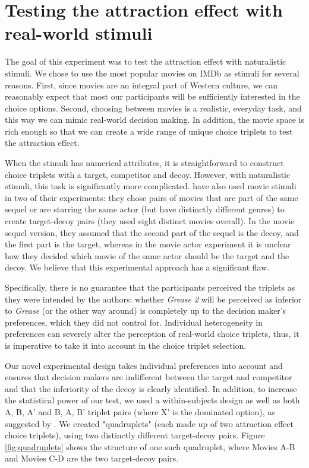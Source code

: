 \documentclass[12pt, a4paper]{article}
\begin{document}
\section{Testing the attraction effect with real-world stimuli}

The goal of this experiment was to test the attraction effect with naturalistic stimuli. We chose to use the most popular movies on IMDb as stimuli for several reasons. First, since movies are an integral part of Western culture, we can reasonably expect that most our participants will be sufficiently interested in the choice options. Second, choosing between movies is a realistic, everyday task, and this way we can mimic real-world decision making. In addition, the movie space is rich enough so that we can create a wide range of unique choice triplets to test the attraction effect.

When the stimuli has numerical attributes, it is straightforward to construct choice triplets with a target, competitor and decoy. However, with naturalistic stimuli, this task is significantly more complicated. \citeauthor{Frederick2014} have also used movie stimuli in two of their experiments: they chose pairs of movies that are part of the same sequel or are starring the same actor (but have distinctly different genres) to create target-decoy pairs (they used eight distinct movies overall). In the movie sequel version, they assumed that the second part of the sequel is the decoy, and the first part is the target, whereas in the movie actor experiment it is unclear how they decided which movie of the same actor should be the target and the decoy. We believe that this experimental approach has a significant flaw. 

Specifically, there is no guarantee that the participants perceived the triplets as they were intended by the authors: whether \textit{Grease 2} will be perceived as inferior to \textit{Grease} (or the other way around) is completely up to the decision maker's preferences, which they did not control for. Individual heterogeneity in preferences can severely alter the perception of real-world choice triplets, thus, it is imperative to take it into account in the choice triplet selection. 

Our novel experimental design takes individual preferences into account and ensures that decision makers are indifferent between the target and competitor and that the inferiority of the decoy is clearly identified. In addition, to increase the statistical power of our test, we used a within-subjects design as well as both A, B, A' and B, A, B' triplet pairs (where X' is the dominated option), as suggested by . We created "quadruplets" (each made up of two attraction effect choice triplets), using two distinctly different target-decoy pairs. Figure \ref{fig:quadruplets} shows the structure of one such quadruplet, where Movies A-B and Movies C-D are the two target-decoy pairs.
\end{document}
